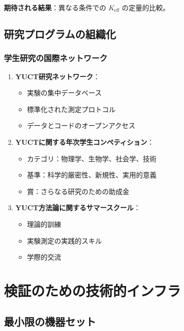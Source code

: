 \documentclass[12pt,a4paper]{article}
\begin{document}
	\textbf{期待される結果}：異なる条件での \(K_{\mathrm{eff}}\) の定量的比較。
	
	\subsection{研究プログラムの組織化}
	
	\subsubsection{学生研究の国際ネットワーク}
	
	\begin{enumerate}
		\item \textbf{YUCT研究ネットワーク}：
		\begin{itemize}
			\item 実験の集中データベース
			\item 標準化された測定プロトコル
			\item データとコードのオープンアクセス
		\end{itemize}
		
		\item \textbf{YUCTに関する年次学生コンペティション}：
		\begin{itemize}
			\item カテゴリ：物理学、生物学、社会学、技術
			\item 基準：科学的厳密性、新規性、実用的意義
			\item 賞：さらなる研究のための助成金
		\end{itemize}
		
		\item \textbf{YUCT方法論に関するサマースクール}：
		\begin{itemize}
			\item 理論的訓練
			\item 実験測定の実践的スキル
			\item 学際的交流
		\end{itemize}
	\end{enumerate}
	
	\section{検証のための技術的インフラ}
	
	\subsection{最小限の機器セット}
	
\end{document}
